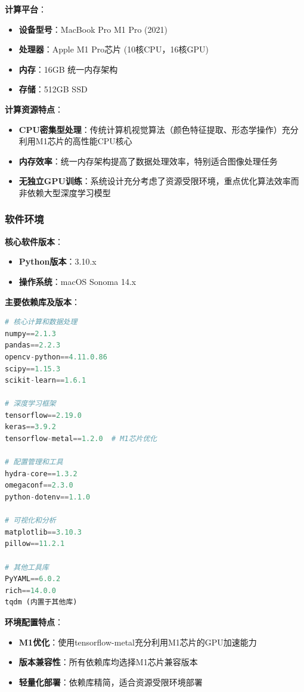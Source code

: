 \documentclass[12pt,a4paper]{article}
\begin{document}
\textbf{计算平台}：
\begin{itemize}
    \item \textbf{设备型号}：MacBook Pro M1 Pro (2021)
    \item \textbf{处理器}：Apple M1 Pro芯片 (10核CPU，16核GPU)
    \item \textbf{内存}：16GB 统一内存架构
    \item \textbf{存储}：512GB SSD
\end{itemize}

\textbf{计算资源特点}：
\begin{itemize}
    \item \textbf{CPU密集型处理}：传统计算机视觉算法（颜色特征提取、形态学操作）充分利用M1芯片的高性能CPU核心
    \item \textbf{内存效率}：统一内存架构提高了数据处理效率，特别适合图像处理任务
    \item \textbf{无独立GPU训练}：系统设计充分考虑了资源受限环境，重点优化算法效率而非依赖大型深度学习模型
\end{itemize}

\subsubsection{软件环境}

\textbf{核心软件版本}：
\begin{itemize}
    \item \textbf{Python版本}：3.10.x
    \item \textbf{操作系统}：macOS Sonoma 14.x
\end{itemize}

\textbf{主要依赖库及版本}：
\begin{lstlisting}[language=Python]
# 核心计算和数据处理
numpy==2.1.3
pandas==2.2.3
opencv-python==4.11.0.86
scipy==1.15.3
scikit-learn==1.6.1

# 深度学习框架
tensorflow==2.19.0
keras==3.9.2
tensorflow-metal==1.2.0  # M1芯片优化

# 配置管理和工具
hydra-core==1.3.2
omegaconf==2.3.0
python-dotenv==1.1.0

# 可视化和分析
matplotlib==3.10.3
pillow==11.2.1

# 其他工具库
PyYAML==6.0.2
rich==14.0.0
tqdm (内置于其他库)
\end{lstlisting}

\textbf{环境配置特点}：
\begin{itemize}
    \item \textbf{M1优化}：使用tensorflow-metal充分利用M1芯片的GPU加速能力
    \item \textbf{版本兼容性}：所有依赖库均选择M1芯片兼容版本
    \item \textbf{轻量化部署}：依赖库精简，适合资源受限环境部署
\end{itemize}
\end{document}
